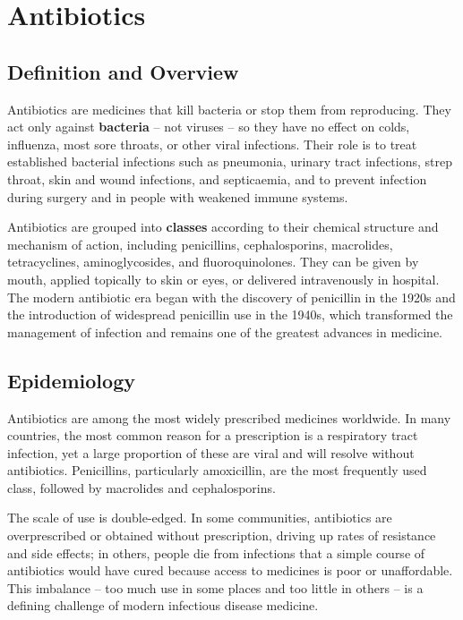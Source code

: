 \chapter{Antibiotics}

\section*{Definition and Overview}
Antibiotics are medicines that kill bacteria or stop them from reproducing. They act only against \textbf{bacteria} -- not viruses -- so they have no effect on colds, influenza, most sore throats, or other viral infections. Their role is to treat established bacterial infections such as pneumonia, urinary tract infections, strep throat, skin and wound infections, and septicaemia, and to prevent infection during surgery and in people with weakened immune systems.

Antibiotics are grouped into \textbf{classes} according to their chemical structure and mechanism of action, including penicillins, cephalosporins, macrolides, tetracyclines, aminoglycosides, and fluoroquinolones. They can be given by mouth, applied topically to skin or eyes, or delivered intravenously in hospital. The modern antibiotic era began with the discovery of penicillin in the 1920s and the introduction of widespread penicillin use in the 1940s, which transformed the management of infection and remains one of the greatest advances in medicine.

\section*{Epidemiology}
Antibiotics are among the most widely prescribed medicines worldwide. In many countries, the most common reason for a prescription is a respiratory tract infection, yet a large proportion of these are viral and will resolve without antibiotics. Penicillins, particularly amoxicillin, are the most frequently used class, followed by macrolides and cephalosporins.

The scale of use is double-edged. In some communities, antibiotics are overprescribed or obtained without prescription, driving up rates of resistance and side effects; in others, people die from infections that a simple course of antibiotics would have cured because access to medicines is poor or unaffordable. This imbalance -- too much use in some places and too little in others -- is a defining challenge of modern infectious disease medicine.


